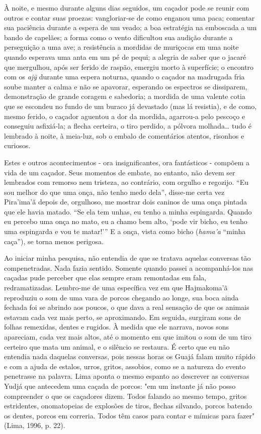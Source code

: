 À noite, e mesmo durante alguns dias seguidos, um caçador pode se reunir
com outros e contar suas proezas: vangloriar-se de como enganou uma
paca; comentar sua paciência durante a espera de um veado; a boa
estratégia na emboscada a um bando de capelães; a forma como o vento
dificultou sua audição durante a perseguição a uma ave; a resistência a
mordidas de muriçocas em uma noite quando esperava uma anta em um pé de
pequi; a alegria de saber que o jacaré que mergulhou, após ser ferido de
raspão, emergiu morto à superfície; o encontro com os \emph{ajỹ} durante
uma espera noturna, quando o caçador na madrugada fria soube manter a
calma e não se apavorar, esperando os espectros se dissiparem,
demonstração de grande coragem e sabedoria; a mordida de uma valente
cotia que se escondeu no fundo de um buraco já devastado (mas lá
resistia), e de como, mesmo ferido, o caçador aguentou a dor da mordida,
agarrou-a pelo pescoço e conseguiu asfixiá-la; a flecha certeira, o tiro
perdido, a pólvora molhada\ldots{} tudo é lembrado à noite, à meia-luz, sob o
embalo de comentários atentos, risonhos e curiosos.

Estes e outros acontecimentos - ora insignificantes, ora fantásticos -
compõem a vida de um caçador. Seus momentos de embate, no entanto, não
devem ser lembrados com remorso nem tristeza, ao contrário, com orgulho
e regozijo. ``Eu sou melhor do que uma onça, não tenho medo dela'',
disse-me certa vez Pira'ima'ã depois de, orgulhoso, me mostrar dois
caninos de uma onça pintada que ele havia matado. ``Se ela tem unhas, eu
tenho a minha espingarda. Quando eu percebo uma onça no mato, eu a chamo
bem alto, `pode vir bicho, eu tenho uma espingarda e vou te matar!''' E
a onça, vista como bicho (\emph{hama'a} ``minha caça''), se torna menos
perigosa.

Ao iniciar minha pesquisa, não entendia de que se tratava aquelas
conversas tão compenetradas. Nada fazia sentido. Somente quando passei a
acompanhá-los nas caçadas pude perceber que elas sempre eram remontadas
em fala, redramatizadas. Lembro-me de uma específica vez em que
Hajmakoma'ã reproduziu o som de uma vara de porcos chegando ao longe,
sua boca ainda fechada foi se abrindo aos poucos, o que dava a real
sensação de que os animais estavam cada vez mais perto, se aproximando.
Em seguida, surgiram sons de folhas remexidas, dentes e rugidos. À
medida que ele narrava, novos sons apareciam, cada vez mais altos, até o
momento em que imitou o som de um tiro certeiro que mata um animal, e o
silêncio se restaura. É certo que eu não entendia nada daquelas
conversas, pois nessas horas os Guajá falam muito rápido e com a ajuda
de estalos, urros, gritos, assobios, como se a natureza do evento
penetrasse na palavra. Lima aponta o mesmo espanto ao descrever as
conversas Yudjá que antecedem uma caçada de porcos: "em um instante já
não posso compreender o que os caçadores dizem. Todos falando ao mesmo
tempo, gritos estridentes, onomatopeias de explosões de tiros, flechas
silvando, porcos batendo os dentes, porcos em correria. Todos têm casos
para contar e mímicas para fazer" (Lima, 1996, p. 22).

